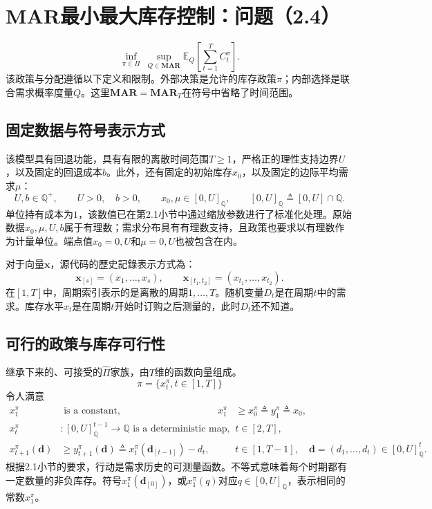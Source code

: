 \documentclass{article}
\begin{document}
\section*{MAR最小最大库存控制：问题（2.4）}
\begin{equation}
\inf_{\pi\in\Pi}\ \sup_{Q\in\mathbf{MAR}}
\mathbb{E}_{Q}\left[\sum_{t=1}^{T}C_t^\pi\right].
\tag{2.4}
\end{equation}
该政策与分配遵循以下定义和限制。外部决策是允许的库存政策\(\pi\)；内部选择是联合需求概率度量\(Q\)。这里\(\mathbf{MAR}=\mathbf{MAR}_T\)在符号中省略了时间范围。

\subsection*{固定数据与符号表示方式}
该模型具有回退功能，具有有限的离散时间范围\(T\geq1\)，严格正的理性支持边界\(U\)，以及固定的回退成本\(b\)。此外，还有固定的初始库存\(x_0\)，以及固定的边际平均需求\(\mu\)：
\[
U,b\in\mathbb{Q}^{+},\qquad U>0,\quad b>0,\qquad
x_0,\mu\in[0,U]_{\mathbb{Q}},
\qquad [0,U]_{\mathbb{Q}}\triangleq[0,U]\cap\mathbb{Q}.
\]
单位持有成本为\(1\)，该数值已在第2.1小节中通过缩放参数进行了标准化处理。原始数据\(x_0,\mu,U,b\)属于有理数；需求分布具有有理数支持，且政策也要求以有理数作为计量单位。端点值\(x_0=0,U\)和\(\mu=0,U\)也被包含在内。

对于向量\(\mathbf{x}\)，源代码的歷史記錄表示方式為：
\[
\mathbf{x}_{[s]}=(x_1,\ldots,x_s),\qquad
\mathbf{x}_{[t_1,t_2]}=(x_{t_1},\ldots,x_{t_2}).
\]
在\([1,T]\)中，周期索引表示的是离散的周期\(1,\ldots,T\)。随机变量\(D_t\)是在周期\(t\)中的需求。库存水平\(x_t\)是在周期\(t\)开始时订购之后测量的，此时\(D_t\)还不知道。

\subsection*{可行的政策与库存可行性}
继承下来的、可接受的\(\hat\Pi\)家族，由\(T\)维的函数向量组成。
\[
\pi=\{x_t^\pi,t\in[1,T]\}
\]
令人满意
\begin{align*}
x_1^\pi&\text{ is a constant},&
x_1^\pi&\geq x_0^\pi\triangleq y_1^\pi\triangleq x_0,\\
x_t^\pi&:[0,U]_{\mathbb{Q}}^{t-1}\longrightarrow\mathbb{Q}
\text{ is a deterministic map},&&t\in[2,T],\\
x_{t+1}^\pi(\mathbf d)&\geq y_{t+1}^\pi(\mathbf d)
\triangleq x_t^\pi(\mathbf d_{[t-1]})-d_t,
&&t\in[1,T-1],\quad
\mathbf d=(d_1,\ldots,d_t)\in[0,U]_{\mathbb{Q}}^t.
\end{align*}
根据2.1小节的要求，行动是需求历史的可测量函数。不等式意味着每个时期都有一定数量的非负库存。符号\(x_1^\pi(\mathbf d_{[0]})\)，或\(x_1^\pi(q)\)对应\(q\in[0,U]_{\mathbb{Q}}\)，表示相同的常数\(x_1^\pi\)。
\end{document}
